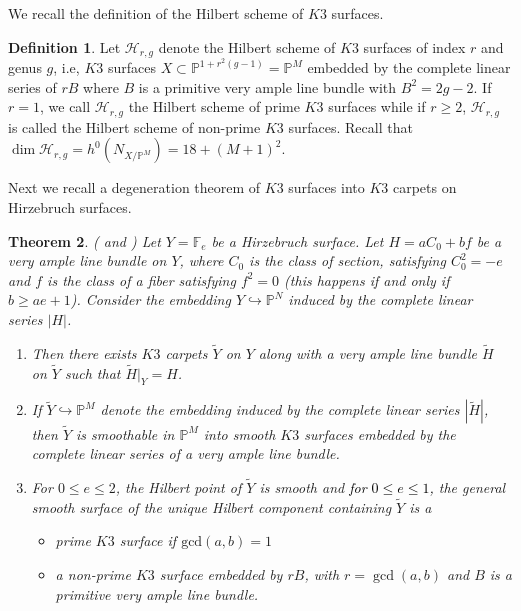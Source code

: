 \documentclass[11pt,reqno]{amsart}
\theoremstyle{plain}
\newtheorem{theorem}{Theorem}[section]
\theoremstyle{definition}
\newtheorem{definition}[theorem]{Definition}
\begin{document}
\color{black}
We recall the definition of the Hilbert scheme of $K3$ surfaces.

\begin{definition}\label{Hilbert schemes of K3 surfaces}
    Let $\mathcal{H}_{r,g}$ denote the Hilbert scheme of $K3$ surfaces of index $r$ and genus $g$, i.e, $K3$ surfaces $X \subset \mathbb{P}^{1+r^2(g-1)} = \mathbb{P}^M$ embedded by the complete linear series of $rB$ where $B$ is a primitive very ample line bundle with $B^2 = 2g-2$. If $r = 1$, we call $\mathcal{H}_{r,g}$ the Hilbert scheme of prime $K3$ surfaces while if $r \geq 2$, $\mathcal{H}_{r,g}$ is called the Hilbert scheme of non-prime $K3$ surfaces. Recall that $\operatorname{dim}\mathcal{H}_{r,g} = h^0(N_{X/\mathbb{P}^M}) =  18+(M+1)^2$.
\end{definition}
\color{black}

Next we recall a degeneration theorem of $K3$ surfaces into $K3$ carpets on Hirzebruch surfaces.

\begin{theorem}\label{degeneration into $K3$ carpets}(\cite[ \textcolor{black}{Theorems $3.1, 4.3, 4.4, 5.1$}]{BMR21} and \cite[\textcolor{black}{Proposition $1.7$, Theorems $3.5, 4.1$}]{GP97})
Let $Y = \mathbb{F}_e$ be a Hirzebruch surface. Let $H = aC_0+bf$ be a very ample line bundle on $Y$, where $C_0$ is the class of section, satisfying $C_0^2 = -e$ and $f$ is the class of a fiber satisfying $f^2 = 0$ (this happens if and only if $b \geq ae+1$). Consider the embedding $Y \hookrightarrow \mathbb{P}^N$ induced by the complete linear series $|H|$.  
\begin{enumerate}
    \item Then there exists $K3$ carpets $\widetilde{Y}$ on $Y$ along with a very ample line bundle $\widetilde{H}$ on $\widetilde{Y}$ such that $\widetilde{H}|_Y = H$.

    \item If $\widetilde{Y} \hookrightarrow \mathbb{P}^M$ denote the embedding induced by the complete linear series $|\widetilde{H}|$, then $\widetilde{Y}$ is smoothable in $\mathbb{P}^M$ into smooth $K3$ surfaces embedded by the complete linear series of a very ample line bundle.

    \item For $0 \leq e \leq 2$, the Hilbert point of $\widetilde{Y}$ is smooth and \textcolor{black}{for} \textcolor{black}{$0 \leq e \leq 1$,} the general smooth surface of the unique Hilbert component containing $\widetilde{Y}$ is a 
    \begin{itemize}
        \item[(a)] prime $K3$ surface if $\textrm{gcd}(a,b) = 1$ 
        \item[(b)] a non-prime $K3$ surface embedded by $rB$, with $r = \operatorname{gcd}(a,b)$ and $B$ is a primitive very ample line bundle. 
    \end{itemize}
\end{enumerate}
\end{theorem}
\end{document}
